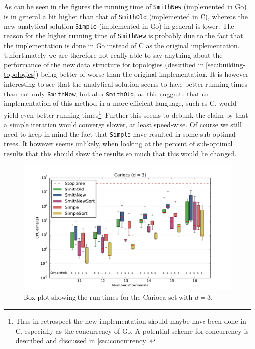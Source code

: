 As can be seen in the figures the running time of \texttt{SmithNew} (implemented
in Go) is in general a bit higher than that of \texttt{SmithOld} (implemented in
C), whereas the new analytical solution \texttt{Simple} (implemented in Go) in
general is lower. The reason for the higher running time of \texttt{SmithNew} is
probably due to the fact that the implementation is done in Go instead of C as
the original implementation. Unfortunately we are therefore not really able to
say anything about the performance of the new data structure for topologies
(described in \cref{sec:building-topologies}) being better of worse than the
original implementation. It is however interesting to see that the analytical
solution seems to have better running times than not only \texttt{SmithNew}, but
also \texttt{SmithOld}, as this suggests that an implementation of this method
in a more efficient language, such as C, would yield even better running
times\footnote{Thus in retrospect the new implementation should maybe have been
  done in C, especially as the concurrency of Go. A potential scheme for
  concurrency is described and discussed in \cref{sec:concurrency}.}. Further
this seems to debunk the claim by \textcite{smith1992} that a simple iteration
would converge slower, at least speed-wise. Of course we still need to keep in
mind the fact that \texttt{Simple} have resulted in some sub-optimal trees. It
however seems unlikely, when looking at the percent of sub-optimal results that
this should skew the results so much that this would be changed.

\begin{figure}[htbp]
  \centering
  \includegraphics[width=\textwidth]{gfx/boxplots/plot_nvst_boxplot_d3_Carioca_1}
  \caption[Box-plot for Carioca with $d = 3$]{Box-plot showing the run-times for
    the Carioca set with $d = 3$.\label{fig:boxplot-carioca-d3}}
\end{figure}

